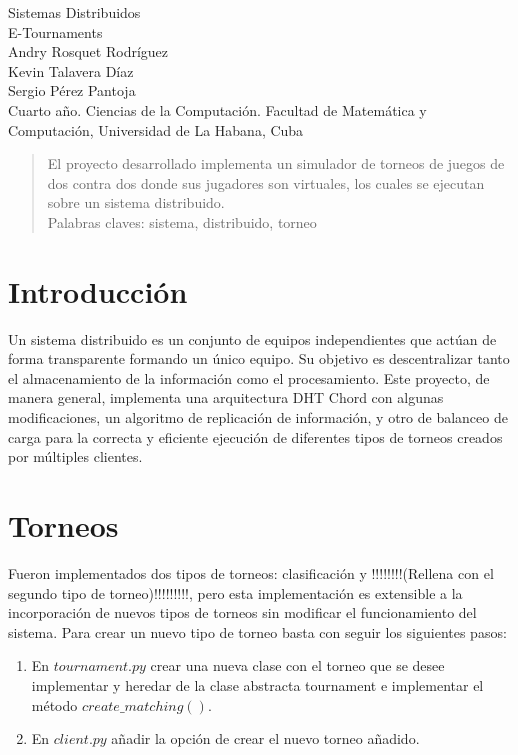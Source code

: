\documentclass[10pt, a4paper]{article}
\begin{document}
	\begin{center}
		\large{Sistemas Distribuidos} \\
		\huge{E-Tournaments}\\
		\vspace{1em}
		\normalsize Andry Rosquet Rodr\'iguez \\ Kevin Talavera D\'iaz\\ Sergio P\'erez Pantoja\\
		\vspace{1em}
		\small Cuarto a\~no. Ciencias de la Computaci\'on.
		\small Facultad de Matem\'atica y Computaci\'on, Universidad de La Habana, Cuba
	\end{center}

    \begin{abstract}
    	El proyecto desarrollado implementa un simulador de torneos de juegos de dos contra dos donde sus jugadores son virtuales, los cuales se ejecutan sobre un sistema distribuido.\\
    	Palabras claves: sistema, distribuido, torneo 
    \end{abstract}
    \section{Introducci\'on}
    Un sistema distribuido es un conjunto de equipos independientes que act\'uan de forma transparente formando un \'unico equipo. Su objetivo es descentralizar tanto el almacenamiento de la informaci\'on como el procesamiento. Este proyecto, de manera general, implementa una arquitectura DHT Chord con algunas modificaciones, un algoritmo de replicaci\'on de informaci\'on, y otro de balanceo de carga para la correcta y eficiente ejecuci\'on de diferentes tipos de torneos creados por m\'ultiples clientes.
    
    \section{Torneos}
    Fueron implementados dos tipos de torneos: clasificación y !!!!!!!!(Rellena con el segundo tipo de torneo)!!!!!!!!!, pero esta implementación es extensible a la incorporación de nuevos tipos de torneos sin modificar el funcionamiento del sistema. Para crear un nuevo tipo de torneo basta con seguir los siguientes pasos:\\
    \begin{enumerate}
    	\item En $tournament.py$ crear una nueva clase con el torneo que se desee implementar y heredar de la clase abstracta tournament e implementar el método $create\_matching()$.\\
    	\item En $client.py$ añadir la opción de crear el nuevo torneo añadido.\\
    \end{enumerate}
    
\end{document}

